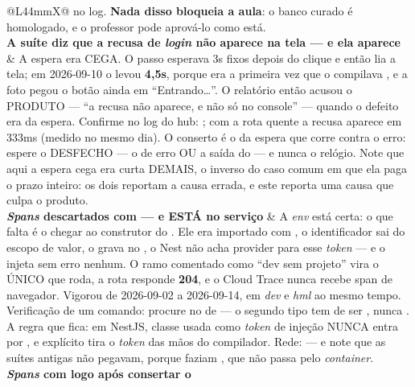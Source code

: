 \begin{tabularx}{\linewidth}{@{}L{44mm}X@{}}
   no log. \textbf{Nada disso bloqueia a aula}: o
  banco curado é homologado, e o professor pode aprová-lo como está.\\
\textbf{A suíte diz que a recusa de \emph{login} não aparece na tela --- e ela
aparece} &
  A espera era CEGA. O passo esperava 3s fixos depois do clique e então lia a
  tela; em 2026-09-10 o  levou
  \textbf{4,5s}, porque era a primeira vez que o  compilava
  , e a foto pegou o botão ainda em
  \enquote{Entrando\ldots}. O relatório então acusou o PRODUTO --- \enquote{a
  recusa não aparece, e não só no console} --- quando o defeito era da espera.
  Confirme no log do hub:
  ; com a rota quente a
  recusa aparece em 333ms (medido no mesmo dia). O conserto é o da espera que
  corre contra o erro: espere o DESFECHO --- o  de erro OU a saída
  do  --- e nunca o relógio. Note que aqui a espera cega era curta
  DEMAIS, o inverso do caso comum em que ela paga o prazo inteiro: os dois
  reportam a causa errada, e este reporta uma causa que culpa o produto.\\
\zebra \textbf{\emph{Spans} descartados com  --- e
 ESTÁ no serviço} &
  A \emph{env} está certa: o que falta é o  chegar ao
  construtor do . Ele era importado com ,
  o identificador sai do escopo de valor, o  grava
   no , o Nest não acha provider para esse
  \emph{token} --- e o  injeta  sem erro nenhum.
  O ramo comentado como \enquote{dev sem projeto} vira o ÚNICO que roda, a rota
  responde \textbf{204}, e o Cloud Trace nunca recebe span de navegador. Vigorou
  de 2026-09-02 a 2026-09-14, em \emph{dev} e \emph{hml} ao mesmo tempo.
  Verificação de um comando: procure  no
   de  --- o segundo tipo tem de ser
  , nunca . A regra
  que fica: em NestJS, classe usada como \emph{token} de injeção NUNCA entra por
  , e  explícito tira o \emph{token} das mãos do
  compilador. Rede:  --- e
  note que as suítes antigas não pegavam, porque faziam
  , que não passa pelo \emph{container}.\\
\textbf{\emph{Spans} com  logo após consertar o
}
\end{tabularx}
